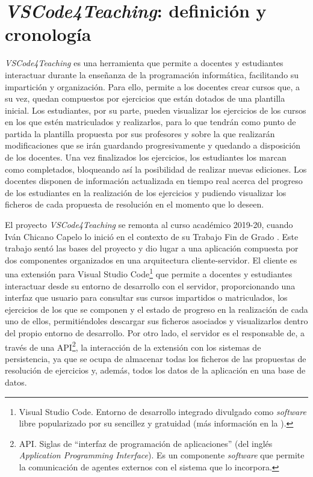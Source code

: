 \section{\textit{VSCode4Teaching}: definición y cronología}
\label{sec:cronologiaProyecto}
\textit{VSCode4Teaching} es una herramienta que permite a docentes y estudiantes interactuar durante la enseñanza de la programación informática, facilitando su impartición y organización. Para ello, permite a los docentes crear cursos que, a su vez, quedan compuestos por ejercicios que están dotados de una plantilla inicial. Los estudiantes, por su parte, pueden visualizar los ejercicios de los cursos en los que estén matriculados y realizarlos, para lo que tendrán como punto de partida la plantilla propuesta por sus profesores y sobre la que realizarán modificaciones que se irán guardando progresivamente y quedando a disposición de los docentes. Una vez finalizados los ejercicios, los estudiantes los marcan como completados, bloqueando así la posibilidad de realizar nuevas ediciones. Los docentes disponen de información actualizada en tiempo real acerca del progreso de los estudiantes en la realización de los ejercicios y pudiendo visualizar los ficheros de cada propuesta de resolución en el momento que lo deseen.

El proyecto \textit{VSCode4Teaching} se remonta al curso académico 2019-20, cuando Iván Chicano Capelo lo inició en el contexto de su Trabajo Fin de Grado \cite{TFG_Ivan}. Este trabajo sentó las bases del proyecto y dio lugar a una aplicación compuesta por dos componentes organizados en una arquitectura cliente-servidor. El cliente es una extensión para Visual Studio Code\footnote{Visual Studio Code. Entorno de desarrollo integrado divulgado como \textit{software} libre popularizado por su sencillez y gratuidad (más información en la ).} que permite a docentes y estudiantes interactuar desde su entorno de desarrollo con el servidor, proporcionando una interfaz que usuario para consultar sus cursos impartidos o matriculados, los ejercicios de los que se componen y el estado de progreso en la realización de cada uno de ellos, permitiéndoles descargar sus ficheros asociados y visualizarlos dentro del propio entorno de desarrollo. Por otro lado, el servidor es el responsable de, a través de una API\footnote{API. Siglas de ``interfaz de programación de aplicaciones'' (del inglés \textit{Application Programming Interface}). Es un componente \textit{software} que permite la comunicación de agentes externos con el sistema que lo incorpora.}, la interacción de la extensión con los sistemas de persistencia, ya que se ocupa de almacenar todas los ficheros de las propuestas de resolución de ejercicios y, además, todos los datos de la aplicación en una base de datos.

